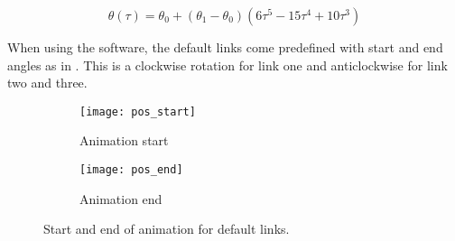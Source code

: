 \begin{equation}\label{quintic}
\theta\left ( \tau \right ) = \theta_0 + \left ( \theta_1 - \theta_0\right )\left ( 6 \tau^5-15\tau^4 + 10\tau^3\right )
\end{equation}

When using the software, the \textsf{default links} come predefined with start and end angles as in . This is a clockwise rotation for link one and anticlockwise for link two and three.

\begin{figure}[ht!]
\begin{subfigure}[b]{0.32\textwidth}
    \centering
    \texttt{[image: pos\_start]}
    \caption{Animation start}
\end{subfigure}
\hfill
\begin{subfigure}[b]{0.4\textwidth}
    \centering
    \texttt{[image: pos\_end]}
    \caption{Animation end}
\end{subfigure}
\caption{Start and end of animation for default links.}
\label{animation}
\end{figure}
